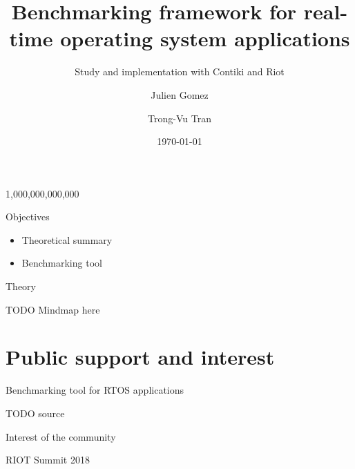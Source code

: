 \documentclass{beamer}
\title{Benchmarking framework for real-time operating system applications}
\subtitle{Study and implementation with Contiki and Riot}
\author{Julien Gomez \and Trong-Vu Tran}
\institute{Université catholique de Louvain}
\date{\today}
\begin{document}

\frame{\titlepage}

\begin{frame}{}
\protect\hypertarget{embedded-systems}{}
\begin{center}
  \LARGE 1,000,000,000,000
\end{center}

\end{frame}

\begin{frame}{Objectives}
\protect\hypertarget{objectives}{}

\begin{itemize}
\tightlist
\item
  Theoretical summary
\item
  Benchmarking tool
\end{itemize}

\end{frame}


\begin{frame}{Theory}
\protect\hypertarget{theory}{}

TODO Mindmap here

\end{frame}


\hypertarget{public-support-and-interest}{%
\section{Public support and interest}\label{public-support-and-interest}}

\begin{frame}{Benchmarking tool for RTOS applications}
\protect\hypertarget{benchmarking-tool-for-rtos-applications}{}

TODO source

\end{frame}


\begin{frame}{Interest of the community}
\protect\hypertarget{interest-of-the-community}{}

RIOT Summit 2018

\end{frame}

\end{document}
